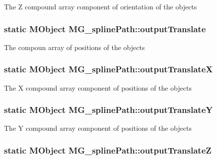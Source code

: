 The Z compound array component of orientation of the objects \hypertarget{class_m_g__spline_path_a7cd73c49d392f6a01c98b094c376180b}{
\subsubsection[{output\-Translate}]{\setlength{\rightskip}{0pt plus 5cm}static M\-Object M\-G\-\_\-spline\-Path\-::output\-Translate\hspace{0.3cm}{\ttfamily [static]}}}\label{class_m_g__spline_path_a7cd73c49d392f6a01c98b094c376180b}
The compoun array of positions of the objects \hypertarget{class_m_g__spline_path_a7b3702461b7793b0100deedfdf062daa}{
\subsubsection[{output\-Translate\-X}]{\setlength{\rightskip}{0pt plus 5cm}static M\-Object M\-G\-\_\-spline\-Path\-::output\-Translate\-X\hspace{0.3cm}{\ttfamily [static]}}}\label{class_m_g__spline_path_a7b3702461b7793b0100deedfdf062daa}
The X compound array component of positions of the objects \hypertarget{class_m_g__spline_path_a8384dcde6a55dfbefc90e39bbf466f31}{
\subsubsection[{output\-Translate\-Y}]{\setlength{\rightskip}{0pt plus 5cm}static M\-Object M\-G\-\_\-spline\-Path\-::output\-Translate\-Y\hspace{0.3cm}{\ttfamily [static]}}}\label{class_m_g__spline_path_a8384dcde6a55dfbefc90e39bbf466f31}
The Y compound array component of positions of the objects \hypertarget{class_m_g__spline_path_a27a87348d64922cc593395b5eeb06d62}{
\subsubsection[{output\-Translate\-Z}]{\setlength{\rightskip}{0pt plus 5cm}static M\-Object M\-G\-\_\-spline\-Path\-::output\-Translate\-Z\hspace{0.3cm}{\ttfamily [static]}}}\label{class_m_g__spline_path_a27a87348d64922cc593395b5eeb06d62}
